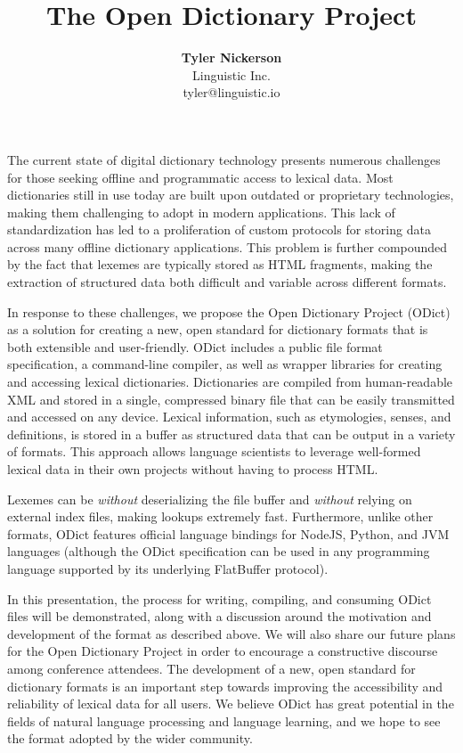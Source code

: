 \documentclass{article}
\begin{document}
\title{\textbf{The Open Dictionary Project}}
\author{\textbf{Tyler Nickerson} \\ \small{Linguistic Inc.} \\ \small{tyler@linguistic.io}}
\date{}
\maketitle
The current state of digital dictionary technology presents numerous challenges for those seeking offline and programmatic access to lexical data. Most dictionaries still in use today are built upon outdated or proprietary technologies, making them challenging to adopt in modern applications. This lack of standardization has led to a proliferation of custom protocols for storing data across many offline dictionary applications. This problem is further compounded by the fact that lexemes are typically stored as HTML fragments, making the extraction of structured data both difficult and variable across different formats.

In response to these challenges, we propose the Open Dictionary Project (ODict) as a solution for creating a new, open standard for dictionary formats that is both extensible and user-friendly. ODict includes a public file format specification, a command-line compiler, as well as wrapper libraries for creating and accessing lexical dictionaries. Dictionaries are compiled from human-readable XML and stored in a single, compressed binary file that can be easily transmitted and accessed on any device. Lexical information, such as etymologies, senses, and definitions, is stored in a buffer as structured data that can be output in a variety of formats. This approach allows language scientists to leverage well-formed lexical data in their own projects without having to process HTML.

Lexemes can be \emph{without} deserializing the file buffer and \emph{without} relying on external index files, making lookups extremely fast. Furthermore, unlike other formats, ODict features official language bindings for NodeJS, Python, and JVM languages (although the ODict specification can be used in any programming language supported by its underlying FlatBuffer protocol).

In this presentation, the process for writing, compiling, and consuming ODict files will be demonstrated, along with a discussion around the motivation and development of the format as described above. We will also share our future plans for the Open Dictionary Project in order to encourage a constructive discourse among conference attendees. The development of a new, open standard for dictionary formats is an important step towards improving the accessibility and reliability of lexical data for all users. We believe ODict has great potential in the fields of natural language processing and language learning, and we hope to see the format adopted by the wider community.
\end{document}
